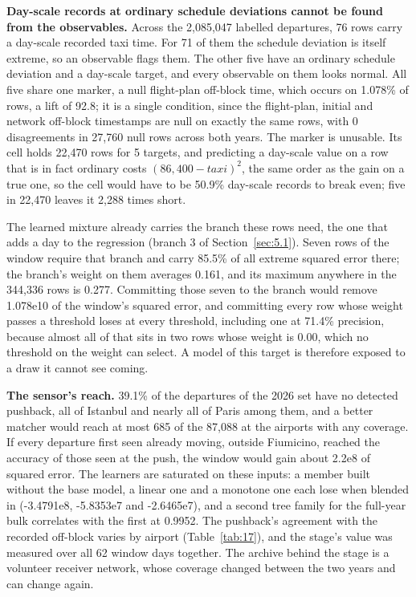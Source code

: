 \documentclass[
  manuscript=article,
  layout=preprint,
  year=2026,
  volume=x,
]{extra/joas}
\begin{document}
\textbf{Day-scale records at ordinary schedule deviations cannot be found from the observables.} Across the 2,085,047 labelled departures, 76 rows carry a day-scale recorded taxi time. For 71 of them the schedule deviation is itself extreme, so an observable flags them. The other five have an ordinary schedule deviation and a day-scale target, and every observable on them looks normal. All five share one marker, a null flight-plan off-block time, which occurs on 1.078\% of rows, a lift of 92.8; it is a single condition, since the flight-plan, initial and network off-block timestamps are null on exactly the same rows, with 0 disagreements in 27,760 null rows across both years. The marker is unusable. Its cell holds 22,470 rows for 5 targets, and predicting a day-scale value on a row that is in fact ordinary costs $(86{,}400 - \mathit{taxi})^2$, the same order as the gain on a true one, so the cell would have to be 50.9\% day-scale records to break even; five in 22,470 leaves it 2,288 times short.

The learned mixture already carries the branch these rows need, the one that adds a day to the regression (branch 3 of Section~\ref{sec:5.1}). Seven rows of the window require that branch and carry 85.5\% of all extreme squared error there; the branch's weight on them averages 0.161, and its maximum anywhere in the 344,336 rows is 0.277. Committing those seven to the branch would remove 1.078e10 of the window's squared error, and committing every row whose weight passes a threshold loses at every threshold, including one at 71.4\% precision, because almost all of that sits in two rows whose weight is 0.00, which no threshold on the weight can select. A model of this target is therefore exposed to a draw it cannot see coming.

\textbf{The sensor's reach.} 39.1\% of the departures of the 2026 set have no detected pushback, all of Istanbul and nearly all of Paris among them, and a better matcher would reach at most 685 of the 87,088 at the airports with any coverage. If every departure first seen already moving, outside Fiumicino, reached the accuracy of those seen at the push, the window would gain about 2.2e8 of squared error. The learners are saturated on these inputs: a member built without the base model, a linear one and a monotone one each lose when blended in (-3.4791e8, -5.8353e7 and -2.6465e7), and a second tree family for the full-year bulk correlates with the first at 0.9952. The pushback's agreement with the recorded off-block varies by airport (Table~\ref{tab:17}), and the stage's value was measured over all 62 window days together. The archive behind the stage is a volunteer receiver network, whose coverage changed between the two years and can change again.
\end{document}
